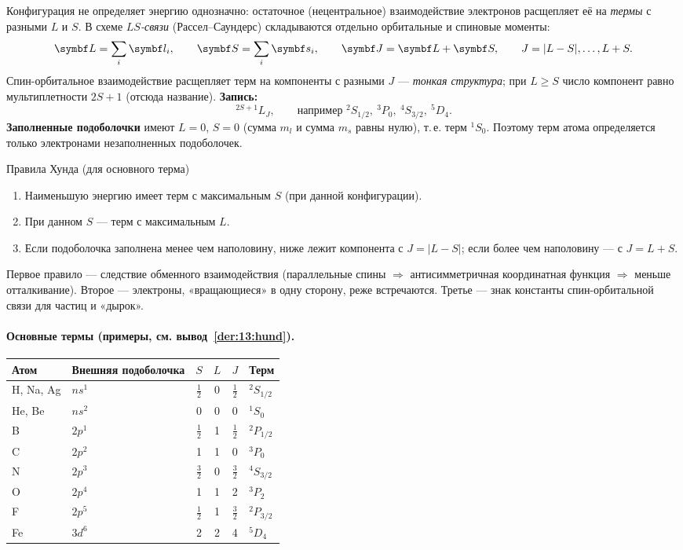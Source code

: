 Конфигурация не определяет энергию однозначно: остаточное (нецентральное) взаимодействие электронов
расщепляет её на \emph{термы} с разными $L$ и $S$. В схеме \emph{$LS$-связи} (Рассел--Саундерс) складываются отдельно
орбитальные и спиновые моменты:
\begin{equation}\label{eq:13:LS}
  \vect L=\sum_i\vect l_i,\qquad \vect S=\sum_i\vect s_i,\qquad \vect J=\vect L+\vect S,\qquad
  J=|L-S|,\dots,L+S .
\end{equation}
Спин-орбитальное взаимодействие расщепляет терм на компоненты с разными $J$ — \emph{тонкая структура};
при $L\ge S$ число компонент равно мультиплетности $2S+1$ (отсюда название). \textbf{Запись:}
\[
  ^{2S+1}L_J,\qquad\text{например } ^2S_{1/2},\ ^3P_0,\ ^4S_{3/2},\ ^5D_4 .
\]
\textbf{Заполненные подоболочки} имеют $L=0$, $S=0$ (сумма $m_l$ и сумма $m_s$ равны нулю), т.\,е. терм $^1S_0$.
Поэтому терм атома определяется только электронами незаполненных подоболочек.

\begin{principle}{Правила Хунда (для основного терма)}
\begin{enumerate}[leftmargin=1.4em]
 \item Наименьшую энергию имеет терм с максимальным $S$ (при данной конфигурации).
 \item При данном $S$ — терм с максимальным $L$.
 \item Если подоболочка заполнена менее чем наполовину, ниже лежит компонента с $J=|L-S|$; если более чем
       наполовину — с $J=L+S$.
\end{enumerate}
\end{principle}

Первое правило — следствие обменного взаимодействия (параллельные спины $\Rightarrow$ антисимметричная
координатная функция $\Rightarrow$ меньше отталкивание). Второе — электроны, «вращающиеся» в одну сторону,
реже встречаются. Третье — знак константы спин-орбитальной связи для частиц и «дырок».

\paragraph{Основные термы (примеры, см. вывод~\ref{der:13:hund}).}
\begin{center}
\small
\begin{tabular}{@{}llcccl@{}}
\toprule
Атом & Внешняя подоболочка & $S$ & $L$ & $J$ & Терм \\
\midrule
H, Na, Ag & $ns^1$ & $\frac12$ & 0 & $\frac12$ & $^2S_{1/2}$ \\
He, Be & $ns^2$ & 0 & 0 & 0 & $^1S_0$ \\
B & $2p^1$ & $\frac12$ & 1 & $\frac12$ & $^2P_{1/2}$ \\
C & $2p^2$ & 1 & 1 & 0 & $^3P_0$ \\
N & $2p^3$ & $\frac32$ & 0 & $\frac32$ & $^4S_{3/2}$ \\
O & $2p^4$ & 1 & 1 & 2 & $^3P_2$ \\
F & $2p^5$ & $\frac12$ & 1 & $\frac32$ & $^2P_{3/2}$ \\
Fe & $3d^6$ & 2 & 2 & 4 & $^5D_4$ \\
\bottomrule
\end{tabular}
\end{center}

